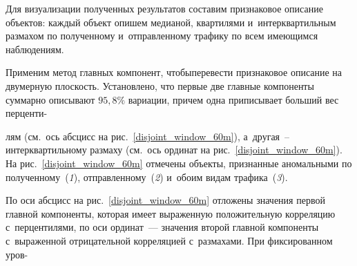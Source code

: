 \begin{multicols}{2}


Для визуализации полученных результатов со\-ста\-вим при\-зна\-ко\-вое описание объектов: 
каж\-дый объект опишем медианой, квар\-ти\-ля\-ми и~ин\-тер\-квар\-тиль\-ным размахом по 
полученному и~от\-прав\-лен\-ному трафику по всем име\-ющим\-ся наблю\-де\-ниям. 
{

}

Применим 
метод главных компонент, чтобы\linebreak пе\-ре\-вес\-ти при\-зна\-ко\-вое описание на двумерную 
плос\-кость. Уста\-нов\-ле\-но, что пер\-вые две глав\-ные компоненты суммарно описывают 
$95{,}8\%$ вариации, причем одна приписывает  больший вес перценти-\linebreak
\vspace*{-11pt}

\columnbreak

\noindent
лям (см.\ 
ось абсцисс на рис.~\ref{disjoint_window_60m}), а~другая~--ин\-тер\-квар\-тиль\-но\-му 
раз\-ма\-ху (см.\ ось ординат на рис.~\ref{disjoint_window_60m}). 
На рис.~\ref{disjoint_window_60m} отмечены объекты, при\-знан\-ные 
аномальными по полученному~(\textit{1}), отправленному~(\textit{2}) и~обоим видам трафика~(\textit{3}).

По оси абсцисс на рис.~\ref{disjoint_window_60m} отложены значения пер\-вой 
глав\-ной компоненты, которая имеет вы\-ра\-жен\-ную положительную корреляцию 
с~пер\-цен\-ти\-ля\-ми, по оси ординат~--- значения второй главной компоненты  
с~выраженной отрицательной корре\-ляцией с~раз\-ма\-ха\-ми. При фиксированном уров-\linebreak
\vspace*{-12pt}


\end{multicols}

\begin{figure*} %
\vspace*{-1pt}
\begin{center}
   \mbox{%
\epsfxsize=151.725mm 
}
\end{center}
\vspace*{-12pt}
    \label{bytime_60m}
\vspace*{10pt}
\begin{center}
   \mbox{%
\epsfxsize=148.725mm 
}
\end{center}
\vspace*{-12pt}
    \label{bymachine_60m}
\vspace*{-6pt}
\end{figure*}

